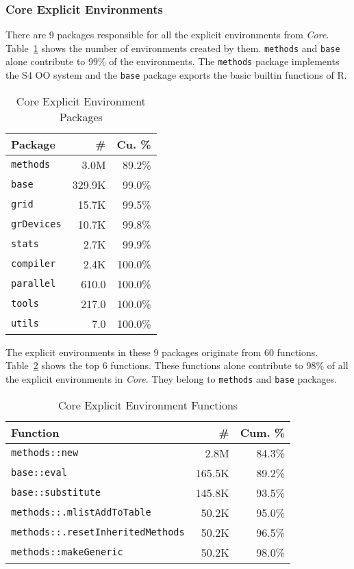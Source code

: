 \documentclass[10pt,review,sigplan,anonymous=true,authorversion=true,nonacm=true]{acmart}
\newcommand{\code}[1]{\lstinline |#1|\xspace}
\begin{document}
\subsubsection{Core Explicit Environments}

There are 9 packages responsible for all the explicit environments from
\emph{Core}. Table~\ref{table:core_explicit_pack} shows the number of
environments created by them. \code{methods} and \code{base} alone contribute to
99\% of the environments. The \code{methods} package implements the S4 OO system
and the \code{base} package exports the basic builtin functions of R.

\begin{table}[!h]
  \vspace{-3mm}
  \small
  \caption{Core Explicit Environment Packages} \label{table:core_explicit_pack}
  \centering
  \begin{tabular}{lrr}
    \toprule
    \textbf{Package}&\textbf{\#}&\textbf{Cu. \%}\\
    \midrule
    \code{methods}&3.0M&89.2\%\\
    \code{base}&329.9K&99.0\%\\
    \code{grid}&15.7K&99.5\%\\
    \code{grDevices}&10.7K&99.8\%\\
    \code{stats}&2.7K&99.9\%\\
    \code{compiler}&2.4K&100.0\%\\
    \code{parallel}&610.0&100.0\%\\
    \code{tools}&217.0&100.0\%\\
    \code{utils}&7.0&100.0\%\\
    \bottomrule
  \end{tabular}
\end{table}

The explicit environments in these 9 packages originate from 60 functions.
Table~\ref{table:core_explicit_fun} shows the top 6 functions. These functions
alone contribute to 98\% of all the explicit environments in \emph{Core}. They
belong to \code{methods} and \code{base} packages.

\begin{table}[!h]
  \vspace{-3mm}
  \small
  \caption{Core Explicit Environment Functions} \label{table:core_explicit_fun}
  \centering
  \begin{tabular}{lrr}
    \toprule
    \textbf{Function}&\textbf{\#}&\textbf{Cum. \%}\\
    \midrule
    \code{methods::new}&2.8M&84.3\%\\
    \code{base::eval}&165.5K&89.2\%\\
    \code{base::substitute}&145.8K&93.5\%\\
    \code{methods::.mlistAddToTable}&50.2K&95.0\%\\
    \code{methods::.resetInheritedMethods}&50.2K&96.5\%\\
    \code{methods::makeGeneric}&50.2K&98.0\%\\
    \bottomrule
  \end{tabular}
\end{table}
\end{document}
